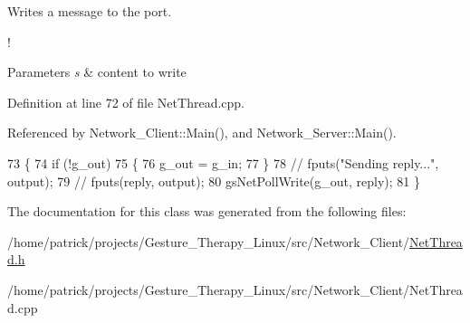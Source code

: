 Writes a message to the port. 

!
\begin{DoxyParams}{Parameters}
{\em s} & content to write \\
\hline
\end{DoxyParams}


Definition at line 72 of file Net\+Thread.\+cpp.



Referenced by Network\+\_\+\+Client\+::\+Main(), and Network\+\_\+\+Server\+::\+Main().


\begin{DoxyCode}
73 \{
74     \textcolor{keywordflow}{if} (!g\_out)
75     \{
76         g\_out = g\_in;
77     \}
78 \textcolor{comment}{//     fputs("Sending reply...", output);}
79 \textcolor{comment}{//     fputs(reply, output);}
80     gsNetPollWrite(g\_out, reply);
81 \}
\end{DoxyCode}


The documentation for this class was generated from the following files\+:\begin{DoxyCompactItemize}
\item 
/home/patrick/projects/\+Gesture\+\_\+\+Therapy\+\_\+\+Linux/src/\+Network\+\_\+\+Client/\hyperlink{_network___client_2_net_thread_8h}{Net\+Thread.\+h}\item 
/home/patrick/projects/\+Gesture\+\_\+\+Therapy\+\_\+\+Linux/src/\+Network\+\_\+\+Client/Net\+Thread.\+cpp\end{DoxyCompactItemize}
